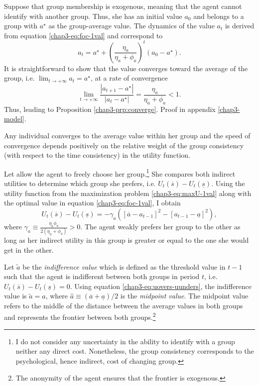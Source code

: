 Suppose that group membership is exogenous, meaning that the agent cannot identify with another group. Thus, she has an initial value $a_0$ and belongs to a group with $a^\star$ as the group-average value. 
The dynamics of the value $a_t$ is derived from equation \eqref{chap3-eq:foc-1val} and correspond to
\begin{equation}\label{chap3-eq:dyn-1val}
    a_t = a^\star + \left(\frac{\eta_a}{\eta_a+\phi_a}\right)^t(a_0-a^\star).
\end{equation}
It is straightforward to show that the value converges toward the average of the group, i.e. $\lim_{t\to+\infty} a_t = a^\star$, at a rate of convergence
\begin{equation*}
    \lim_{t\to+\infty} \frac{\left|a_{t+1}-a^\star\right|}{\left|a_{t}-a^\star\right|} = \frac{\eta_a}{\eta_a+\phi_a} < 1.
\end{equation*}
Thus, leading to Proposition \ref{chap3-prp:converge}. Proof in appendix \ref{chap3-model}.
\begin{proposition}\label{chap3-prp:converge}
    Any individual converges to the average value within her group and the speed of convergence depends positively on the relative weight of the group consistency (with respect to the time consistency) in the utility function.
\end{proposition}

Let allow the agent to freely choose her group.\footnote{I do not consider any uncertainty in the ability to identify with a group neither any direct cost. Nonetheless, the group consistency corresponds to the psychological, hence indirect, cost of changing group.} She compares both indirect utilities to determine which group she prefers, i.e. $U_t(\overline{s}) - U_t(\underline{s})$. Using the utility function from the maximization problem \eqref{chap3-eq:maxU-1val} along with the optimal value in equation \eqref{chap3-eq:foc-1val}, I obtain
\begin{equation}\label{chap3-eq:uovers-uunders}
    U_t(\overline{s}) - U_t(\underline{s}) = -\gamma_a \left(\left[\overline{a}-a_{t-1}\right]^2 - \left[a_{t-1}-\underline{a}\right]^2\right),
\end{equation}
where $\gamma_a \equiv \frac{\eta_a\phi_a}{2(\eta_a+\phi_a)} >0$. The agent weakly prefers her group to the other as long as her indirect utility in this group is greater or equal to the one she would get in the other.

Let $\widetilde{a}$ be the \textit{indifference value} which is defined as the threshold value in $t-1$ such that the agent is indifferent between both groups in period $t$, i.e. $U_t(\overline{s}) - U_t(\underline{s}) = 0$.
Using equation \eqref{chap3-eq:uovers-uunders}, the indifference value is $\widetilde{a} = \widehat{a}$, where $\widehat{a} \equiv (\overline{a}+\underline{a})/2$ is the \textit{midpoint value}.
The midpoint value refers to the middle of the distance between the average values in both groups and represents the frontier between both groups.\footnote{The anonymity of the agent ensures that the frontier is exogenous.}

